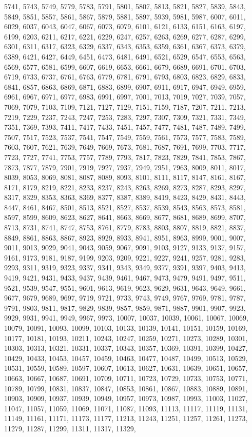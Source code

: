 \documentclass[10pt,twocolumn]{article}
\begin{document}
\begin{thebibliography}{9}
5741, 5743, 5749, 5779, 5783, 5791, 5801, 5807, 5813, 5821, 5827, 5839, 5843, 5849, 5851, 5857, 5861, 5867, 5879, 5881, 5897, 5939, 5981, 5987, 6007, 6011, 6029, 6037, 6043, 6047, 6067, 6073, 6079, 6101, 6121, 6133, 6151, 6163, 6197, 6199, 6203, 6211, 6217, 6221, 6229, 6247, 6257, 6263, 6269, 6277, 6287, 6299, 6301, 6311, 6317, 6323, 6329, 6337, 6343, 6353, 6359, 6361, 6367, 6373, 6379, 6389, 6421, 6427, 6449, 6451, 6473, 6481, 6491, 6521, 6529, 6547, 6553, 6563, 6569, 6577, 6581, 6599, 6607, 6619, 6653, 6661, 6679, 6689, 6691, 6701, 6703, 6719, 6733, 6737, 6761, 6763, 6779, 6781, 6791, 6793, 6803, 6823, 6829, 6833, 6841, 6857, 6863, 6869, 6871, 6883, 6899, 6907, 6911, 6917, 6947, 6949, 6959, 6961, 6967, 6971, 6977, 6983, 6991, 6997, 7001, 7013, 7019, 7027, 7039, 7057, 7069, 7079, 7103, 7109, 7121, 7127, 7129, 7151, 7159, 7187, 7207, 7211, 7213, 7219, 7229, 7237, 7243, 7247, 7253, 7283, 7297, 7307, 7309, 7321, 7331, 7349, 7351, 7369, 7393, 7411, 7417, 7433, 7451, 7457, 7477, 7481, 7487, 7489, 7499, 7507, 7517, 7523, 7537, 7541, 7547, 7549, 7559, 7561, 7573, 7577, 7583, 7589, 7603, 7607, 7621, 7639, 7649, 7669, 7673, 7681, 7687, 7691, 7699, 7703, 7717, 7723, 7727, 7741, 7753, 7757, 7789, 7793, 7817, 7823, 7829, 7841, 7853, 7867, 7873, 7877, 7879, 7901, 7919, 7927, 7937, 7949, 7951, 7963, 8009, 8011, 8017, 8039, 8053, 8069, 8081, 8087, 8089, 8093, 8101, 8111, 8117, 8147, 8161, 8167, 8171, 8179, 8219, 8221, 8233, 8237, 8243, 8263, 8269, 8273, 8287, 8293, 8297, 8317, 8329, 8353, 8363, 8369, 8377, 8387, 8389, 8419, 8423, 8429, 8431, 8443, 8447, 8461, 8467, 8501, 8513, 8521, 8527, 8537, 8539, 8543, 8563, 8573, 8581, 8597, 8599, 8609, 8623, 8627, 8641, 8663, 8669, 8677, 8681, 8689, 8699, 8707, 8713, 8731, 8741, 8747, 8753, 8761, 8779, 8783, 8803, 8807, 8819, 8821, 8837, 8849, 8861, 8863, 8867, 8923, 8929, 8933, 8941, 8951, 8963, 8999, 9001, 9007, 9011, 9013, 9029, 9041, 9043, 9059, 9067, 9091, 9103, 9127, 9133, 9137, 9157, 9161, 9173, 9181, 9187, 9199, 9203, 9209, 9221, 9227, 9241, 9257, 9281, 9283, 9293, 9311, 9319, 9323, 9337, 9341, 9343, 9349, 9377, 9391, 9397, 9403, 9413, 9419, 9421, 9431, 9433, 9437, 9439, 9461, 9467, 9473, 9479, 9491, 9497, 9511, 9521, 9539, 9547, 9551, 9601, 9613, 9619, 9623, 9629, 9631, 9643, 9649, 9661, 9677, 9679, 9689, 9697, 9719, 9721, 9733, 9743, 9749, 9767, 9769, 9781, 9787, 9791, 9803, 9811, 9817, 9829, 9839, 9857, 9859, 9871, 9887, 9901, 9907, 9923, 9929, 9931, 9941, 9949, 9967, 9973, 10007, 10037, 10039, 10061, 10067, 10069, 10079, 10091, 10093, 10099, 10103, 10133, 10139, 10141, 10151, 10159, 10169, 10177, 10181, 10193, 10211, 10243, 10247, 10259, 10271, 10273, 10289, 10301, 10303, 10313, 10321, 10331, 10337, 10343, 10357, 10369, 10391, 10399, 10427, 10429, 10433, 10453, 10457, 10459, 10463, 10477, 10487, 10499, 10513, 10529, 10531, 10559, 10589, 10597, 10607, 10613, 10627, 10631, 10639, 10651, 10657, 10663, 10667, 10687, 10691, 10709, 10711, 10723, 10729, 10733, 10753, 10771, 10789, 10799, 10831, 10837, 10847, 10853, 10861, 10867, 10883, 10889, 10891, 10903, 10909, 10937, 10939, 10949, 10957, 10973, 10987, 10993, 11003, 11027, 11047, 11057, 11059, 11069, 11071, 11087, 11093, 11113, 11117, 11119, 11131, 11149, 11161, 11171, 11173, 11177, 11213, 11243, 11251, 11257, 11261, 11273, 11279, 11287, 11299, 11311, 11317, 11329, 
\end{thebibliography}
\end{document}
